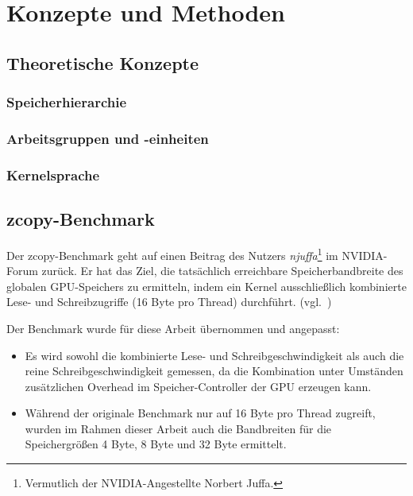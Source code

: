 \section{Konzepte und Methoden}
\label{methoden}

\subsection{Theoretische Konzepte}
\label{methoden:konzepte}

\subsubsection{Speicherhierarchie}

\subsubsection{Arbeitsgruppen und -einheiten}

\subsubsection{Kernelsprache}

\subsection{zcopy-Benchmark}
\label{methoden:zcopy}

Der zcopy-Benchmark geht auf einen Beitrag des Nutzers \textit{njuffa}\footnote{
Vermutlich der NVIDIA-Angestellte Norbert Juffa.} im NVIDIA-Forum zurück. Er
hat das Ziel, die tatsächlich erreichbare Speicherbandbreite des globalen
GPU-Speichers zu ermitteln, indem ein Kernel ausschließlich kombinierte Lese-
und Schreibzugriffe (16 Byte pro Thread) durchführt. (vgl.~\cite{njuffa2017})

Der Benchmark wurde für diese Arbeit übernommen und angepasst:

\begin{itemize}
    \item Es wird sowohl die kombinierte Lese- und Schreibgeschwindigkeit als
          auch die reine Schreibgeschwindigkeit gemessen, da die Kombination
          unter Umständen zusätzlichen Overhead im Speicher-Controller der GPU
          erzeugen kann.
    \item Während der originale Benchmark nur auf 16 Byte pro Thread zugreift,
          wurden im Rahmen dieser Arbeit auch die Bandbreiten für die
          Speichergrößen 4 Byte, 8 Byte und 32 Byte ermittelt.
\end{itemize}

